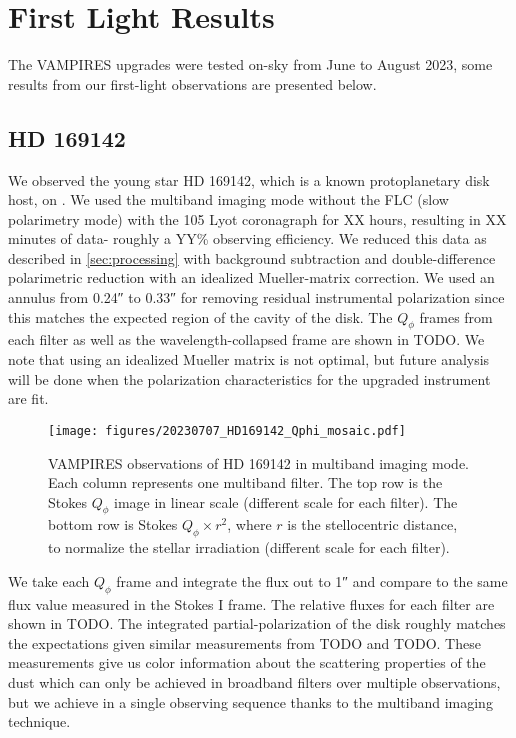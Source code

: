 \section{First Light Results}\label{sec:firstlight}

The VAMPIRES upgrades were tested on-sky from June to August 2023, some results from our first-light observations are presented below.

\subsection{HD 169142\label{sec:hd169142}}

We observed the young star HD 169142, which is a known protoplanetary disk host, on . We used the multiband imaging mode without the FLC (slow polarimetry mode) with the \SI{105}{\mas} Lyot coronagraph for XX hours, resulting in XX minutes of data- roughly a YY\% observing efficiency. We reduced this data as described in \autoref{sec:processing} with background subtraction and double-difference polarimetric reduction with an idealized Mueller-matrix correction. We used an annulus from \ang{;;0.24} to \ang{;;0.33} for removing residual instrumental polarization since this matches the expected region of the cavity of the disk. The $Q_\phi$ frames from each filter as well as the wavelength-collapsed frame are shown in TODO. We note that using an idealized Mueller matrix is not optimal, but future analysis will be done when the polarization characteristics for the upgraded instrument are fit.

\begin{figure*}[t]
    \centering
    \texttt{[image: figures/20230707\_HD169142\_Qphi\_mosaic.pdf]}
    \caption{ VAMPIRES observations of HD 169142 in multiband imaging mode. Each column represents one multiband filter. The top row is the Stokes $Q_\phi$ image in linear scale (different scale for each filter). The bottom row is  Stokes $Q_\phi\times r^2$, where $r$ is the stellocentric distance, to normalize the stellar irradiation (different scale for each filter).\label{fig:hd169142_mosaic}}
\end{figure*}

We take each $Q_\phi$ frame and integrate the flux out to \ang{;;1} and compare to the same flux value measured in the Stokes I frame. The relative fluxes for each filter are shown in TODO. The integrated partial-polarization of the disk roughly matches the expectations given similar measurements from TODO and TODO. These measurements give us color information about the scattering properties of the dust which can only be achieved in broadband filters over multiple observations, but we achieve in a single observing sequence thanks to the multiband imaging technique.

